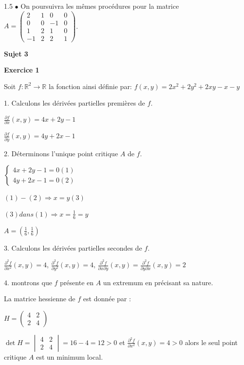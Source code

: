 \documentclass[12pt]{article}
\begin{document}
\begin{spacing}{1.5}
$\bullet$ On poursuivra les mêmes procédures pour la matrice $A=\begin{pmatrix}
 2 & 1 & 0 & 0 \\ 
 0 & 0 & -1 & 0 \\ 
 1 & 2 & 1 & 0 \\ 
 -1 & 2 & 2 & 1
 \end{pmatrix} $.






\medskip\textbf{Sujet 3}

\textbf{Exercice 1}

Soit $f :\mathbb{R}^2\longrightarrow \mathbb{R}$ la fonction ainsi définie par:
 $f(x,y)=2x^2+2y^2+2xy-x-y$
 
1. Calculons les dérivées partielles premières de $f$.
 
 $\frac{\partial f}{\partial x}(x,y)=4x+2y-1$
 
 $\frac{\partial f}{\partial y}(x,y)=4y+2x-1$
 
 
2. Déterminons l'unique point critique $A$ de $f$.

$\begin{cases}
 4x+2y-1=0(1)\\
 4y+2x-1=0(2)
 \end{cases}$
 
 $(1)-(2)\Longrightarrow x=y (3)$
 
 $(3) dans (1)\Longrightarrow x=\frac{1}{6}=y$
 
 \textbf{$A=(\frac{1}{6},\frac{1}{6})$}
 
 3. Calculons les dérivées partielles secondes de $f$.
 
 $\frac{\partial^2f}{\partial x^2}(x,y)=4$, $\frac{\partial^2 f}{\partial y^2}(x,y)=4$, $\frac{\partial^2 f}{\partial x\partial y}(x,y)=\frac{\partial^2 f}{\partial y\partial x}(x,y)=2$
 
 4. montrons que $f$ présente en $A$ un extremum en précisant sa nature.

La matrice hessienne de $f$ est donnée par :

$H=\begin{pmatrix}
4&2\\
2&4
\end{pmatrix}$

$\det H=\begin{vmatrix}
4&2\\
2&4
\end{vmatrix}=16-4=12>0$ et $\frac{\partial^2 f}{\partial x^2}(x,y)=4>0$ alors le seul point critique $A$ est un minimum local.


\end{spacing}
\end{document}
